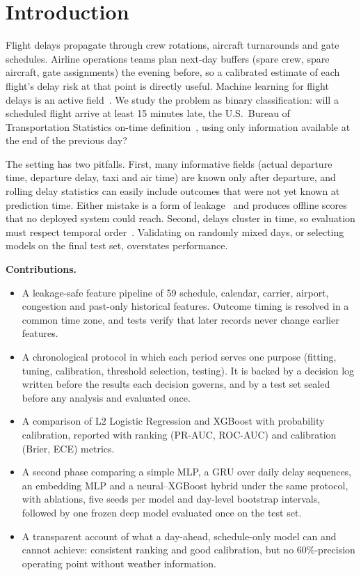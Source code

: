 \section{Introduction}
\label{sec:intro}

Flight delays propagate through crew rotations, aircraft turnarounds and gate schedules. Airline
operations teams plan next-day buffers (spare crew, spare aircraft, gate assignments) the evening
before, so a calibrated estimate of each flight's delay risk at that point is directly useful. Machine
learning for flight delays is an active field~\cite{carvalho2021relevance}. We
study the problem as binary classification: will a scheduled flight arrive at least 15 minutes
late, the U.S.\ Bureau of Transportation Statistics on-time definition~\cite{bts_ontime}, using
only information available at the end of the previous day?

The setting has two pitfalls. First, many informative fields (actual departure time, departure
delay, taxi and air time) are known only after departure, and rolling delay statistics can easily
include outcomes that were not yet known at prediction time. Either mistake is a form of
leakage~\cite{kaufman2012leakage} and produces offline scores that no deployed system could reach.
Second, delays cluster in time, so evaluation must respect temporal order~\cite{bergmeir2012use}.
Validating on randomly mixed days, or selecting models on the final test set, overstates
performance.

\textbf{Contributions.}
\begin{itemize}
  \item A leakage-safe feature pipeline of 59 schedule, calendar, carrier, airport, congestion and
  past-only historical features. Outcome timing is resolved in a common time zone, and tests verify
  that later records never change earlier features.
  \item A chronological protocol in which each period serves one purpose (fitting, tuning,
  calibration, threshold selection, testing). It is backed by a decision log written before the
  results each decision governs, and by a test set sealed before any analysis and evaluated once.
  \item A comparison of L2 Logistic Regression and XGBoost with probability calibration, reported
  with ranking (PR-AUC, ROC-AUC) and calibration (Brier, ECE) metrics.
  \item A second phase comparing a simple MLP, a GRU over daily delay sequences, an embedding MLP
  and a neural--XGBoost hybrid under the same protocol, with ablations, five seeds per model and
  day-level bootstrap intervals, followed by one frozen deep model evaluated once on the test set.
  \item A transparent account of what a day-ahead, schedule-only model can and cannot achieve:
  consistent ranking and good calibration, but no 60\%-precision operating point without weather
  information.
\end{itemize}

